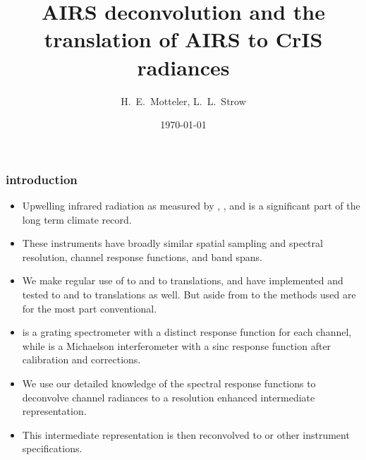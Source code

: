 \documentclass[10pt]{beamer}
\title{AIRS deconvolution and the \\
       translation of AIRS to CrIS radiances \\ 
}
\author{H.~E.~Motteler, L.~L.~Strow}
\institute{
  UMBC Atmospheric Spectroscopy Lab \\
  Joint Center for Earth Systems Technology \\
}
\date{\today}
\begin{document}
\begin{frame}[plain]
\titlepage
\end{frame}
\begin{frame}
\frametitle{introduction}
\begin{itemize}

  \item Upwelling infrared radiation as measured by {\airs},
    {\cris}, and {\iasi} is a significant part of the long term
    climate record.

  \item These instruments have broadly similar spatial sampling and
    spectral resolution, channel response functions, and band spans.

  \item We make regular use of {\airs} to {\cris} and {\iasi} to
    {\cris} translations, and have implemented and tested {\iasi} to
    {\airs} and {\cris} to {\airs} translations as well.  But aside
    from {\airs} to {\cris} the methods used are for the most part
    conventional.

  \item {\airs} is a grating spectrometer with a distinct response
    function for each channel, while {\cris} is a Michaelson
    interferometer with a sinc response function after calibration
    and corrections.

  \item We use our detailed knowledge of the {\airs} spectral
    response functions to deconvolve {\airs} channel radiances to a
    resolution enhanced intermediate representation.

  \item This intermediate representation is then reconvolved to
    {\cris} or other instrument specifications.

\end{itemize}
\end{frame}
\end{document}
